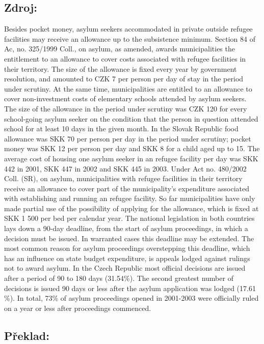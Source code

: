 \documentclass[10pt]{article}
\begin{document}
\subsection*{Zdroj:}

Besides pocket money, asylum seekers accommodated in private outside refugee facilities may receive an allowance up to the subsistence minimum.
Section 84 of Ac, no. 325/1999 Coll., on asylum, as amended, awards municipalities the entitlement to an allowance to cover costs associated with refugee facilities in their territory.
The size of the allowance is fixed every year by government resolution, and amounted to CZK 7 per person per day of stay in the period under scrutiny.
At the same time, municipalities are entitled to an allowance to cover non-investment costs of elementary schools attended by asylum seekers.
The size of the allowance in the period under scrutiny was CZK 120 for every school-going asylum seeker on the condition that the person in question attended school for at least 10 days in the given month.
In the Slovak Republic food allowance was SKK 70 per person per day in the period under scrutiny; pocket money was SKK 12 per person per day and SKK 8 for a child aged up to 15.
The average cost of housing one asylum seeker in an refugee facility per day was SKK 442 in 2001, SKK 447 in 2002 and SKK 445 in 2003.
Under Act no. 480/2002 Coll. (SR), on asylum, municipalities with refugee facilities in their territory receive an allowance to cover part of the municipality's expenditure associated with establishing and running an refugee facility.
So far municipalities have only made partial use of the possibility of applying for the allowance, which is fixed at SKK 1 500 per bed per calendar year.
The national legislation in both countries lays down a 90-day deadline, from the start of asylum proceedings, in which a decision must be issued. In warranted cases this deadline may be extended.
The most common reason for asylum proceedings overstepping this deadline, which has an influence on state budget expenditure, is appeals lodged against rulings not to award asylum.
In the Czech Republic most official decisions are issued after a period of 90 to 180 days (31.54\%).
The second greatest number of decisions is issued 90 days or less after the asylum application was lodged (17.61 \%).
In total, 73\% of asylum proceedings opened in 2001-2003 were officially ruled on a year or less after proceedings commenced.


\pagebreak

\subsection*{Překlad:}
\end{document}
